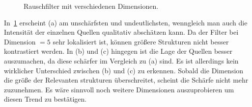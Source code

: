 \documentclass[slug=PET, room=Andreas-Schubert-Bau\,\ 424A, supervisor=Carsten\ Bittrich, coursedate=10.\ 01.\ 2020]{../../Lab_Report_LaTeX/lab_report}
\begin{document}
\begin{figure}[h!]
	\centering
	\caption{Rauschfilter mit verschiedenen Dimensionen.}
	\label{fig:rausch}
\end{figure}

In~\ref{fig:rausch} erscheint (a) am unschärfsten und undeutlichsten,
wenngleich man auch die Intensität der einzelnen Quellen qualitativ
abschätzen kann. Da der Filter bei Dimension \(=5\) sehr lokalisiert
ist, k\"onnen gr\"o\ss{}ere Strukturen nicht besser kontrastiert
werden. In (b) und (c) hingegen ist die Lage der Quellen besser
auszumachen, da diese schärfer im Vergleich zu (a) sind. Es ist
allerdings kein wirklicher Unterschied zwischen (b) und (c) zu
erkennen. Sobald die Dimension die gr\"o\ss{}e der Relevanten
strukturen \"uberschreitet, scheint die Sch\"arfe nicht mehr
zuzunehmen. Es w\"are sinnvoll noch weitere Dimensionen auszuprobieren
um diesen Trend zu best\"atigen.
\end{document}
